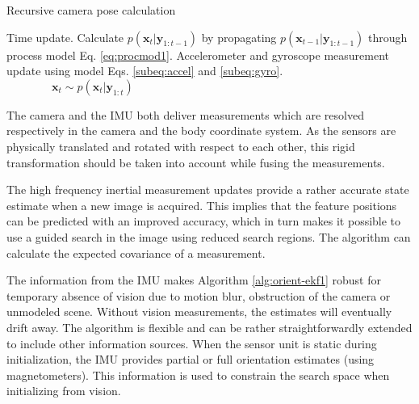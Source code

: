 \begin{algorithm}[H]
	\caption{Recursive camera pose calculation}\label{alg:orient-ekf1}
	\DontPrintSemicolon \SetAlgoLongEnd \SetAlgoLined 
	 
	 {    %
		Time update. Calculate $ p( \bm{x}_{t} | \bm{y}_{1:t-1} ) $ by propagating $ p( \bm{x}_{t-1} | \bm{y}_{1:t-1} ) $ through process model Eq. \ref{eq:procmod1}. \;
		Accelerometer and gyroscope measurement update using model Eqs. \ref{subeq:accel} and \ref{subeq:gyro}. \;
       	$ \qquad\qquad \bm{x}_{t} \sim p ( \bm{x}_{t} | \bm{y}_{1:t} ) $ \;
	} %
\end{algorithm}

The camera and the IMU both deliver measurements which are resolved respectively in the camera and the body coordinate system. As the sensors are physically translated and rotated with respect to each other, this rigid transformation should be taken into account while fusing the measurements.  

The high frequency inertial measurement updates provide a rather accurate state estimate when a new image is acquired. This implies that the feature positions can be predicted with an improved accuracy, which in turn makes it possible to use a guided search in the image using reduced search regions. The algorithm can calculate the expected covariance of a measurement. 

The information from the IMU makes Algorithm \ref{alg:orient-ekf1} robust for temporary absence of vision due to motion blur, obstruction of the camera or unmodeled scene. Without vision measurements, the estimates will eventually drift away. The algorithm is flexible and can be rather straightforwardly extended to include other information sources. When the sensor unit is static during initialization, the IMU provides partial or full orientation estimates (using magnetometers). This information is used to constrain the search space when initializing from vision.

